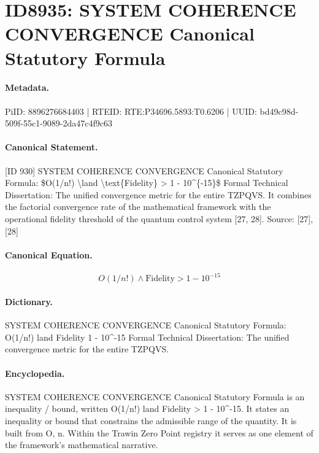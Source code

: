 \section*{ID8935: SYSTEM COHERENCE CONVERGENCE Canonical Statutory Formula}
\paragraph{Metadata.}
PiID: 8896276684403 | RTEID: RTE:P34696.5893:T0.6206 | UUID: bd49c98d-509f-55c1-9089-2da47c4f9c63

\paragraph{Canonical Statement.}
[ID 930] SYSTEM COHERENCE CONVERGENCE Canonical Statutory Formula: \$O(1/n!) \textbackslash{}land \textbackslash{}text\{Fidelity\} > 1 - 10\textasciicircum{}\{-15\}\$ Formal Technical Dissertation: The unified convergence metric for the entire TZPQVS. It combines the factorial convergence rate of the mathematical framework with the operational fidelity threshold of the quantum control system [27, 28]. Source: [27], [28]

\paragraph{Canonical Equation.}
\[
O(1/n!) \land \text{Fidelity} > 1 - 10^{-15}
\]

\paragraph{Dictionary.}
SYSTEM COHERENCE CONVERGENCE Canonical Statutory Formula: O(1/n!) land Fidelity 1 - 10\textasciicircum{}-15 Formal Technical Dissertation: The unified convergence metric for the entire TZPQVS.

\paragraph{Encyclopedia.}
SYSTEM COHERENCE CONVERGENCE Canonical Statutory Formula is an inequality / bound, written O(1/n!) land Fidelity > 1 - 10\textasciicircum{}-15. It states an inequality or bound that constrains the admissible range of the quantity. It is built from O, n. Within the Trawin Zero Point registry it serves as one element of the framework's mathematical narrative.
